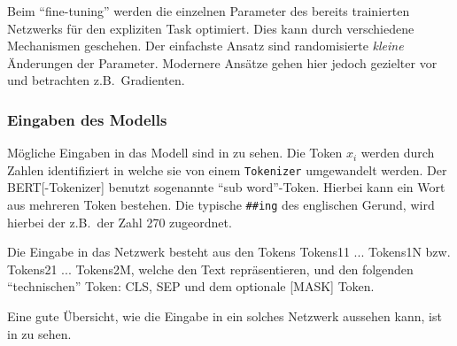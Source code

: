 Beim \enquote{fine-tuning} werden die einzelnen Parameter des bereits trainierten Netzwerks
für den expliziten Task optimiert. \autocite{towardsdatascience:what-exactly-happens-when-we-fine-tune-bert}
Dies kann durch verschiedene Mechanismen geschehen.
Der einfachste Ansatz sind randomisierte \emph{kleine} Änderungen der Parameter.
Modernere Ansätze gehen hier jedoch gezielter vor
und betrachten z.B.\, Gradienten.

\subsubsection{Eingaben des Modells}
Mögliche Eingaben in das Modell sind in 
zu sehen.
Die Token \(x_i\) werden durch Zahlen identifiziert
in welche sie von einem \texttt{Tokenizer} umgewandelt werden.
Der \gls{BERT}[-Tokenizer] benutzt sogenannte \foreignquote{english}{sub word}-Token.
Hierbei kann ein Wort aus mehreren Token bestehen.
Die typische \texttt{\#\#ing} des englischen Gerund,
wird hierbei der z.B.\, der Zahl 270 zugeordnet.


Die Eingabe in das Netzwerk besteht aus den Tokens Tokens11 ... Tokens1N
bzw. Tokens21 ... Tokens2M,
welche den Text repräsentieren,
und den folgenden \enquote{technischen} Token:
CLS, SEP und dem optionale [MASK] Token.

Eine gute Übersicht,
wie die Eingabe in ein solches Netzwerk aussehen kann,
ist in  zu sehen.


